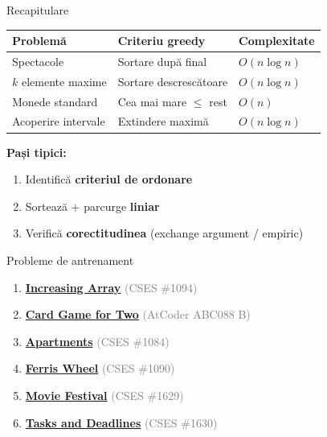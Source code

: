 \documentclass{beamer}
\begin{document}
\begin{frame}{Recapitulare}
  \begin{center}
  \begin{tabular}{lll}
    \toprule
    Problemă & Criteriu greedy & Complexitate \\
    \midrule
    Spectacole          & Sortare după final       & $O(n \log n)$ \\
    $k$ elemente maxime & Sortare descrescătoare   & $O(n \log n)$ \\
    Monede standard     & Cea mai mare $\leq$ rest & $O(n)$ \\
    Acoperire intervale & Extindere maximă         & $O(n \log n)$ \\
    \bottomrule
  \end{tabular}
  \end{center}
  \smallskip
  \textbf{Pași tipici:}
  \begin{enumerate}
    \item Identifică \textbf{criteriul de ordonare}
    \item Sortează $+$ parcurge \textbf{liniar}
    \item Verifică \textbf{corectitudinea} (exchange argument / empiric)
  \end{enumerate}
\end{frame}

\begin{frame}{Probleme de antrenament}
  \begin{enumerate}\itemsep6pt
    \item \href{https://cses.fi/problemset/task/1094}{\textbf{Increasing Array}}
          \textcolor{gray}{(CSES \#1094)}
    \item \href{https://atcoder.jp/contests/abc088/tasks/abc088_b}{\textbf{Card Game for Two}}
          \textcolor{gray}{(AtCoder ABC088 B)}
    \item \href{https://cses.fi/problemset/task/1084}{\textbf{Apartments}}
          \textcolor{gray}{(CSES \#1084)}
    \item \href{https://cses.fi/problemset/task/1090}{\textbf{Ferris Wheel}}
          \textcolor{gray}{(CSES \#1090)}
    \item \href{https://cses.fi/problemset/task/1629}{\textbf{Movie Festival}}
          \textcolor{gray}{(CSES \#1629)}
    \item \href{https://cses.fi/problemset/task/1630}{\textbf{Tasks and Deadlines}}
          \textcolor{gray}{(CSES \#1630)}
  \end{enumerate}
\end{frame}
\end{document}
